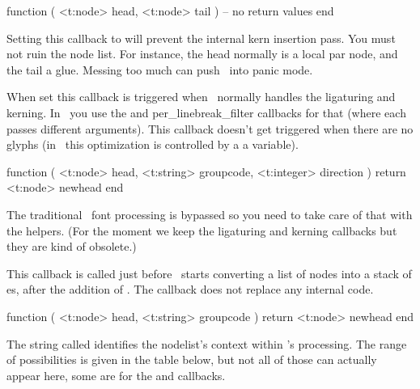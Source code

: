 \starttyping[option=LUA]
function (
    <t:node> head,
    <t:node> tail
)
    -- no return values
end
\stoptyping

Setting this callback to  will prevent the internal kern insertion
pass. You must not ruin the node list. For instance, the head normally is a local
par node, and the tail a glue. Messing too much can push \LUATEX\ into panic
mode.

\stopsubsection

\startsubsection[title=glyph_run]

When set this callback is triggered when \TEX\ normally handles the ligaturing
and kerning. In \LUATEX\ you use the  and \typ
{per_linebreak_filter} callbacks for that (where each passes different
arguments). This callback doesn't get triggered when there are no glyphs (in
\LUATEX\ this optimization is controlled by a a variable).

\starttyping[option=LUA]
function (
    <t:node>    head,
    <t:string>  groupcode,
    <t:integer> direction
)
    return <t:node> newhead
end
\stoptyping

The traditional \TEX\ font processing is bypassed so you need to take care of that
with the helpers. (For the moment we keep the ligaturing and kerning callbacks but
they are kind of obsolete.)

\stopsubsection

\startsubsection[title=pre_linebreak_filter]

This callback is called just before \LUATEX\ starts converting a list of nodes
into a stack of \type {\hbox}es, after the addition of \type {\parfillskip}. The
callback does not replace any internal code.

\starttyping[option=LUA]
function (
    <t:node>   head,
    <t:string> groupcode
)
    return <t:node> newhead
end
\stoptyping

The string called  identifies the nodelist's context within
\TEX's processing. The range of possibilities is given in the table below, but
not all of those can actually appear here, some are for the 
and  callbacks.

